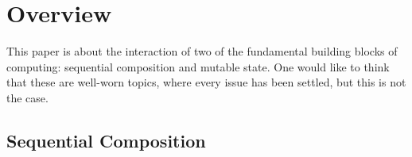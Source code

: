 
\section{Overview}
\label{sec:overview}

This paper is about the interaction of two of the fundamental building blocks
of computing: sequential composition and mutable state. One would like to
think that these are well-worn topics, where every issue has been settled,
but this is not the case.

\subsection{Sequential Composition} %


